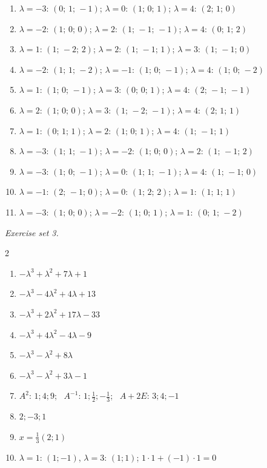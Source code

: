 \begin{enumerate}[label=\arabic*., leftmargin=*, itemsep=1pt]
\item $\lambda=-3$: $(0;\,1;\,-1)$; $\lambda=0$: $(1;\,0;\,1)$; $\lambda=4$: $(2;\,1;\,0)$
\item $\lambda=-2$: $(1;\,0;\,0)$; $\lambda=2$: $(1;\,-1;\,-1)$; $\lambda=4$: $(0;\,1;\,2)$
\item $\lambda=1$: $(1;\,-2;\,2)$; $\lambda=2$: $(1;\,-1;\,1)$; $\lambda=3$: $(1;\,-1;\,0)$
\item $\lambda=-2$: $(1;\,1;\,-2)$; $\lambda=-1$: $(1;\,0;\,-1)$; $\lambda=4$: $(1;\,0;\,-2)$
\item $\lambda=1$: $(1;\,0;\,-1)$; $\lambda=3$: $(0;\,0;\,1)$; $\lambda=4$: $(2;\,-1;\,-1)$
\item $\lambda=2$: $(1;\,0;\,0)$; $\lambda=3$: $(1;\,-2;\,-1)$; $\lambda=4$: $(2;\,1;\,1)$
\item $\lambda=1$: $(0;\,1;\,1)$; $\lambda=2$: $(1;\,0;\,1)$; $\lambda=4$: $(1;\,-1;\,1)$
\item $\lambda=-3$: $(1;\,1;\,-1)$; $\lambda=-2$: $(1;\,0;\,0)$; $\lambda=2$: $(1;\,-1;\,2)$
\item $\lambda=-3$: $(1;\,0;\,-1)$; $\lambda=0$: $(1;\,1;\,-1)$; $\lambda=4$: $(1;\,-1;\,0)$
\item $\lambda=-1$: $(2;\,-1;\,0)$; $\lambda=0$: $(1;\,2;\,2)$; $\lambda=1$: $(1;\,1;\,1)$
\item $\lambda=-3$: $(1;\,0;\,0)$; $\lambda=-2$: $(1;\,0;\,1)$; $\lambda=1$: $(0;\,1;\,-2)$
\end{enumerate}
\par\noindent\emph{Exercise set 3.}\nopagebreak
\begin{multicols}{2}\raggedright
\begin{enumerate}[label=\arabic*., leftmargin=*, itemsep=1pt]
\item $- \lambda^{3} + \lambda^{2} + 7 \lambda + 1$
\item $- \lambda^{3} - 4 \lambda^{2} + 4 \lambda + 13$
\item $- \lambda^{3} + 2 \lambda^{2} + 17 \lambda - 33$
\item $- \lambda^{3} + 4 \lambda^{2} - 4 \lambda - 9$
\item $- \lambda^{3} - \lambda^{2} + 8 \lambda$
\item $- \lambda^{3} - \lambda^{2} + 3 \lambda - 1$
\item $A^2$: $1;4;9$; \ $A^{-1}$: $1;\frac12;-\frac13$; \ $A+2E$: $3;4;-1$
\item $2;-3;1$
\item $x=\frac13(2;1)$
\item $\lambda=1$: $(1;-1)$, $\lambda=3$: $(1;1)$; $1\cdot1+(-1)\cdot1=0$
\end{enumerate}
\end{multicols}
